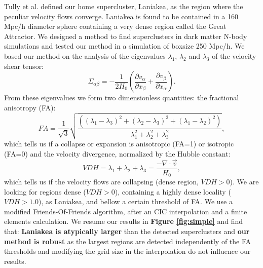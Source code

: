\documentclass[preprint,proceedings]{rmaa}
\begin{document}
Tully et al. defined our home supercluster, Laniakea, as the region where the peculiar
velocity flows converge. Laniakea is found to be contained in a 160 Mpc/h diameter
sphere containing a very dense region called the Great Attractor.
We designed a method to find superclusters in dark matter N-body simulations and tested
our method in a simulation of boxsize 250 Mpc/h. We based our method on the analysis of
the eigenvalues $\lambda_1$, $\lambda_2$ and
 $\lambda_3$ of the velocity shear tensor:
\begin{equation}
  \label{eq:mjump}
  \Sigma _{\alpha\beta} = -\frac{1}{2 H_0} \left( \frac{\partial v_{\alpha}}{\partial
  x_{\beta}} + \frac{\partial v_{\beta}}{\partial x_{\alpha}} \right) .
\end{equation}
From these eigenvalues we form two dimensionless quantities: the fractional anisotropy
(FA):
\begin{equation}
  \label{eq:njump}
   FA = \frac{1}{\sqrt{3}} \sqrt{\frac{( \left( \lambda_1 - \lambda_3 \right)^2 +
   \left( \lambda_2 - \lambda_3 \right)^2 + \left( \lambda_1 - \lambda_2 \right)^2 
   )}{\lambda^{2}_1 + \lambda^{2}_2 + \lambda^{2}_3}},
\end{equation}
which tells us if a collapse or expansion is anisotropic (FA=1) or isotropic (FA=0) and the velocity divergence,
normalized by the Hubble constant:
\begin{equation}
  \label{eq:tjump}
  VDH=\lambda_1 + \lambda_2 + \lambda_3 = \frac{- \nabla \cdot \vec{v}}{H_0},
\end{equation}
which tells us if the velocity flows are collapsing (dense region, $VDH>0$).
We are looking for regions dense ($VDH>0$), containing a highly dense locality
($VDH>1.0$), as Laniakea, and bellow a certain threshold of FA.
We use a modified Friends-Of-Friends algorithm, after an CIC interpolation and a finite
elements calculation. We resume our results in
\textbf{Figure
\ref{fig:simple}} and find that: \textbf{Laniakea is atypically larger} than the detected
superclusters and
\textbf{our method is robust} as the largest regions are detected independently of the
FA
thresholds and modifying the grid size in the interpolation do not influence our
results.
\end{document}
